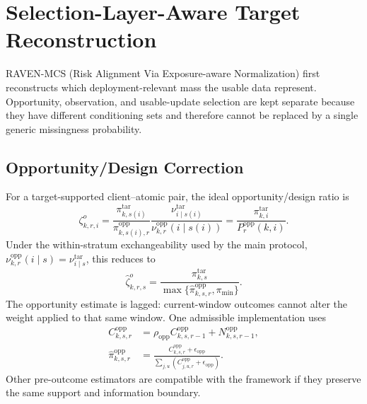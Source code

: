 \documentclass[letterpaper,journal]{IEEEtran}
\begin{document}
\section{Selection-Layer-Aware Target Reconstruction}
\label{sec:reconstruction}

RAVEN-MCS (Risk Alignment Via Exposure-aware Normalization) first reconstructs
which deployment-relevant mass the usable data represent.  Opportunity,
observation, and usable-update selection are kept separate because they have
different conditioning sets and therefore cannot be replaced by a single
generic missingness probability.

\subsection{Opportunity/Design Correction}
\label{subsec:design_correction}

For a target-supported client--atomic pair, the ideal opportunity/design ratio is
\begin{equation}
 \zeta^{o}_{k,r,i}
 =
 \frac{\pi^{\mathrm{tar}}_{k,s(i)}}
      {\pi^{\mathrm{opp}}_{k,s(i),r}}
 \frac{\nu^{\mathrm{tar}}_{i\mid s(i)}}
      {\nu^{\mathrm{opp}}_{k,r}(i\mid s(i))}
 =
 \frac{\pi^{\mathrm{tar}}_{k,i}}
      {P_r^{\mathrm{opp}}(k,i)}.
 \label{eq:design_ratio_general}
\end{equation}
Under the within-stratum exchangeability used by the main protocol,
$\nu^{\mathrm{opp}}_{k,r}(i\mid s)=\nu^{\mathrm{tar}}_{i\mid s}$, this reduces to
\begin{equation}
 \widehat\zeta^{o}_{k,r,s}
 =
 \frac{\pi^{\mathrm{tar}}_{k,s}}
 {\max\{\widehat\pi^{\mathrm{opp}}_{k,s,r},\pi_{\min}\}}.
 \label{eq:design_ratio_simple}
\end{equation}
The opportunity estimate is lagged: current-window outcomes cannot alter the
weight applied to that same window.  One admissible implementation uses
\begin{align}
 C^{\mathrm{opp}}_{k,s,r}
 &=
 \rho_{\mathrm{opp}}C^{\mathrm{opp}}_{k,s,r-1}
 +N^{\mathrm{opp}}_{k,s,r-1},
 \label{eq:opp_ema}\\
 \widehat\pi^{\mathrm{opp}}_{k,s,r}
 &=
 \frac{C^{\mathrm{opp}}_{k,s,r}+\epsilon_{\mathrm{opp}}}
 {\sum_{j,u}
 (C^{\mathrm{opp}}_{j,u,r}+\epsilon_{\mathrm{opp}})}.
 \label{eq:opp_estimate}
\end{align}
Other pre-outcome estimators are compatible with the framework if they preserve
the same support and information boundary.
\end{document}
